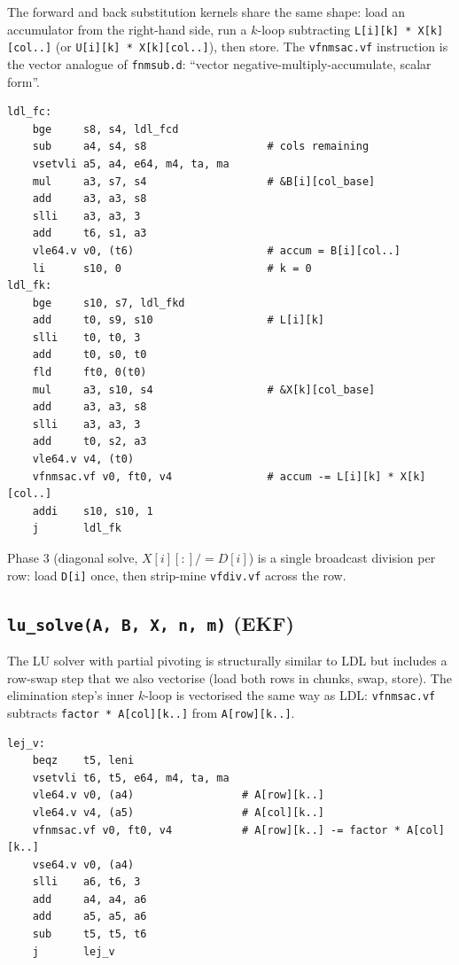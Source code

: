 \documentclass[11pt,a4paper]{article}
\begin{document}
The forward and back substitution kernels share the same shape: load an
accumulator from the right-hand side, run a $k$-loop subtracting
\texttt{L[i][k] * X[k][col..]} (or \texttt{U[i][k] * X[k][col..]}), then
store. The \texttt{vfnmsac.vf} instruction is the vector analogue of
\texttt{fnmsub.d}: ``vector negative-multiply-accumulate, scalar form''.

\begin{lstlisting}[caption={LDL forward substitution --- vectorised across m=276 columns}]
ldl_fc:
    bge     s8, s4, ldl_fcd
    sub     a4, s4, s8                   # cols remaining
    vsetvli a5, a4, e64, m4, ta, ma
    mul     a3, s7, s4                   # &B[i][col_base]
    add     a3, a3, s8
    slli    a3, a3, 3
    add     t6, s1, a3
    vle64.v v0, (t6)                     # accum = B[i][col..]
    li      s10, 0                       # k = 0
ldl_fk:
    bge     s10, s7, ldl_fkd
    add     t0, s9, s10                  # L[i][k]
    slli    t0, t0, 3
    add     t0, s0, t0
    fld     ft0, 0(t0)
    mul     a3, s10, s4                  # &X[k][col_base]
    add     a3, a3, s8
    slli    a3, a3, 3
    add     t0, s2, a3
    vle64.v v4, (t0)
    vfnmsac.vf v0, ft0, v4               # accum -= L[i][k] * X[k][col..]
    addi    s10, s10, 1
    j       ldl_fk
\end{lstlisting}

Phase 3 (diagonal solve, $X[i][:] /= D[i]$) is a single broadcast division
per row: load \texttt{D[i]} once, then strip-mine \texttt{vfdiv.vf} across
the row.

\subsection{\texttt{lu\_solve(A, B, X, n, m)} (EKF)}

The LU solver with partial pivoting is structurally similar to LDL but
includes a row-swap step that we also vectorise (load both rows in chunks,
swap, store). The elimination step's inner $k$-loop is vectorised the same
way as LDL: \texttt{vfnmsac.vf} subtracts \texttt{factor * A[col][k..]}
from \texttt{A[row][k..]}.

\begin{lstlisting}[caption={LU elimination inner loop (vectorised across columns k)}]
lej_v:
    beqz    t5, leni
    vsetvli t6, t5, e64, m4, ta, ma
    vle64.v v0, (a4)                 # A[row][k..]
    vle64.v v4, (a5)                 # A[col][k..]
    vfnmsac.vf v0, ft0, v4           # A[row][k..] -= factor * A[col][k..]
    vse64.v v0, (a4)
    slli    a6, t6, 3
    add     a4, a4, a6
    add     a5, a5, a6
    sub     t5, t5, t6
    j       lej_v
\end{lstlisting}
\end{document}
